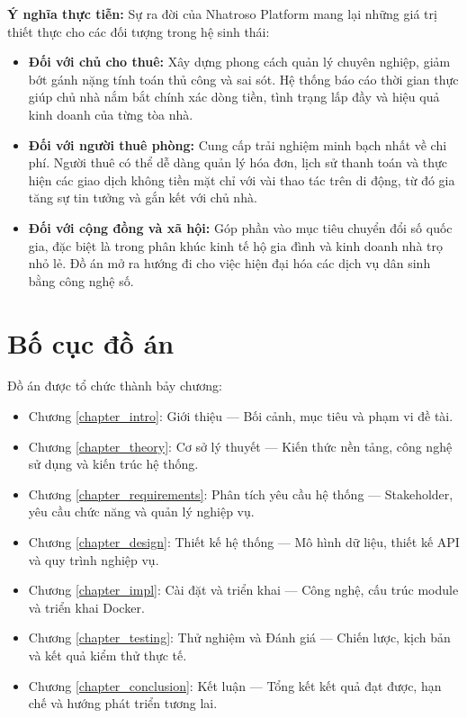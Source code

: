 \textbf{Ý nghĩa thực tiễn:}
Sự ra đời của Nhatroso Platform mang lại những giá trị thiết thực cho các đối tượng trong hệ sinh thái:
\begin{itemize}
    \item \textbf{Đối với chủ cho thuê:} Xây dựng phong cách quản lý chuyên nghiệp, giảm bớt gánh nặng tính toán thủ công và sai sót. Hệ thống báo cáo thời gian thực giúp chủ nhà nắm bắt chính xác dòng tiền, tình trạng lấp đầy và hiệu quả kinh doanh của từng tòa nhà.
    \item \textbf{Đối với người thuê phòng:} Cung cấp trải nghiệm minh bạch nhất về chi phí. Người thuê có thể dễ dàng quản lý hóa đơn, lịch sử thanh toán và thực hiện các giao dịch không tiền mặt chỉ với vài thao tác trên di động, từ đó gia tăng sự tin tưởng và gắn kết với chủ nhà.
    \item \textbf{Đối với cộng đồng và xã hội:} Góp phần vào mục tiêu chuyển đổi số quốc gia, đặc biệt là trong phân khúc kinh tế hộ gia đình và kinh doanh nhà trọ nhỏ lẻ. Đồ án mở ra hướng đi cho việc hiện đại hóa các dịch vụ dân sinh bằng công nghệ số.
\end{itemize}

\section{Bố cục đồ án}

Đồ án được tổ chức thành bảy chương:

 \begin{itemize}
   \item Chương \ref{chapter_intro}: Giới thiệu --- Bối cảnh, mục tiêu và phạm vi đề tài.
   \item Chương \ref{chapter_theory}: Cơ sở lý thuyết --- Kiến thức nền tảng, công nghệ sử dụng và kiến trúc hệ thống.
   \item Chương \ref{chapter_requirements}: Phân tích yêu cầu hệ thống --- Stakeholder, yêu cầu chức năng và quản lý nghiệp vụ.
   \item Chương \ref{chapter_design}: Thiết kế hệ thống --- Mô hình dữ liệu, thiết kế API và quy trình nghiệp vụ.
   \item Chương \ref{chapter_impl}: Cài đặt và triển khai --- Công nghệ, cấu trúc module và triển khai Docker.
   \item Chương \ref{chapter_testing}: Thử nghiệm và Đánh giá --- Chiến lược, kịch bản và kết quả kiểm thử thực tế.
   \item Chương \ref{chapter_conclusion}: Kết luận --- Tổng kết kết quả đạt được, hạn chế và hướng phát triển tương lai.
 \end{itemize}
